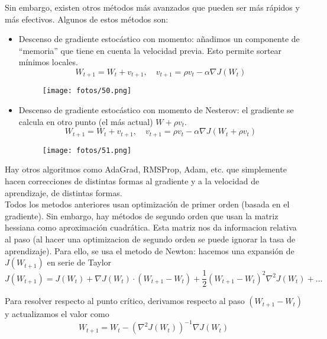 Sin embargo, existen otros métodos más avanzados que pueden ser más rápidos y más efectivos. Algunos de estos métodos son:
\begin{itemize}
    \item Descenso de gradiente estocástico con momento: añadimos un componente de ``memoria'' que tiene en cuenta la velocidad previa. Esto permite sortear mínimos locales.
    \begin{equation}
        W_{t + 1} = W_t + v_{t + 1}, \quad v_{t + 1} = \rho v_t - \alpha \nabla J (W_t) 
    \end{equation}
    \begin{figure}[H]
    \centering
    \texttt{[image: fotos/50.png]}
    \end{figure}
    \item Descenso de gradiente estocástico con momento de Nesterov: el gradiente se calcula en otro punto (el más actual) $W + \rho v_t$.
    \begin{equation}
        W_{t + 1} = W_t + v_{t + 1}, \quad v_{t + 1} = \rho v_t - \alpha \nabla J (W_t + \rho v_t)
    \end{equation}
    \begin{figure}[H]
    \centering
    \texttt{[image: fotos/51.png]}
    \end{figure}
\end{itemize}

Hay otros algoritmos como AdaGrad, RMSProp, Adam, etc. que simplemente hacen correcciones de distintas formas al gradiente y a la velocidad de aprendizaje, de distintas formas. \\

Todos los metodos anteriores usan optimización de primer orden (basada en el gradiente). Sin embargo, hay métodos de segundo orden que usan la matriz hessiana como aproximación cuadrática. Esta matriz nos da informacion relativa al paso (al hacer una optimizacion de segundo orden se puede ignorar la tasa de aprendizaje). Para ello, se usa el metodo de Newton: hacemos una expansión de $J(W_{t + 1})$ en serie de Taylor
\begin{equation}
J(W_{t + 1}) = J(W_t) + \nabla J(W_t) \cdot (W_{t + 1} - W_t) + \frac{1}{2} (W_{t + 1} - W_t)^2 \nabla^2 J (W_t)  + \dots
\end{equation}

Para resolver respecto al punto crítico, derivamos respecto al paso $(W_{t + 1} - W_t)$ y actualizamos el valor como
\begin{equation}
W_{t + 1} = W_t - (\nabla^2 J (W_t))^{-1} \nabla J (W_t)
\end{equation}

